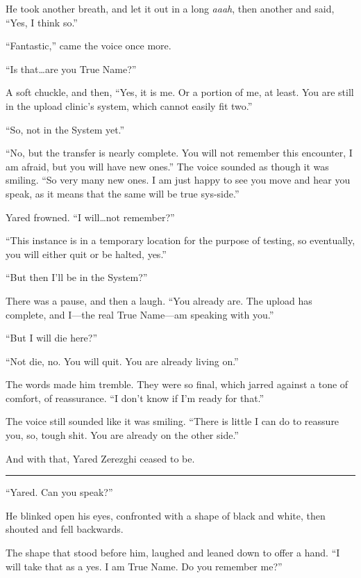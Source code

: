 He took another breath, and let it out in a long \emph{aaah}, then another and said, ``Yes, I think so.''

``Fantastic,'' came the voice once more.

``Is that\ldots are you True Name?''

A soft chuckle, and then, ``Yes, it is me. Or a portion of me, at least. You are still in the upload clinic's system, which cannot easily fit two.''

``So, not in the System yet.''

``No, but the transfer is nearly complete. You will not remember this encounter, I am afraid, but you will have new ones.'' The voice sounded as though it was smiling. ``So very many new ones. I am just happy to see you move and hear you speak, as it means that the same will be true sys-side.''

Yared frowned. ``I will\ldots{}not remember?''

``This instance is in a temporary location for the purpose of testing, so eventually, you will either quit or be halted, yes.''

``But then I'll be in the System?''

There was a pause, and then a laugh. ``You already are. The upload has complete, and I---the real True Name---am speaking with you.''

``But I will die here?''

``Not die, no. You will quit. You are already living on.''

The words made him tremble. They were so final, which jarred against a tone of comfort, of reassurance. ``I don't know if I'm ready for that.''

The voice still sounded like it was smiling. ``There is little I can do to reassure you, so, tough shit. You are already on the other side.''

And with that, Yared Zerezghi ceased to be.

\begin{center}\rule{0.5\linewidth}{0.5pt}\end{center}

``Yared. Can you speak?''

He blinked open his eyes, confronted with a shape of black and white, then shouted and fell backwards.

The shape that stood before him, laughed and leaned down to offer a hand. ``I will take that as a yes. I am True Name. Do you remember me?''


